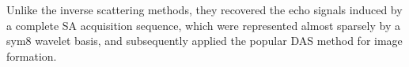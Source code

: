 Unlike
the inverse scattering methods,
they recovered
the echo signals induced by
a complete \ac{SA} acquisition sequence, which were represented almost sparsely by
a sym8 wavelet basis, and subsequently applied
the popular \ac{DAS} method for
image formation.
